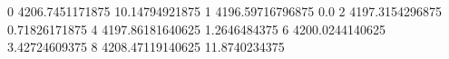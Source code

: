 0 4206.7451171875 10.14794921875
1 4196.59716796875 0.0
2 4197.3154296875 0.71826171875
4 4197.86181640625 1.2646484375
6 4200.0244140625 3.42724609375
8 4208.47119140625 11.8740234375
